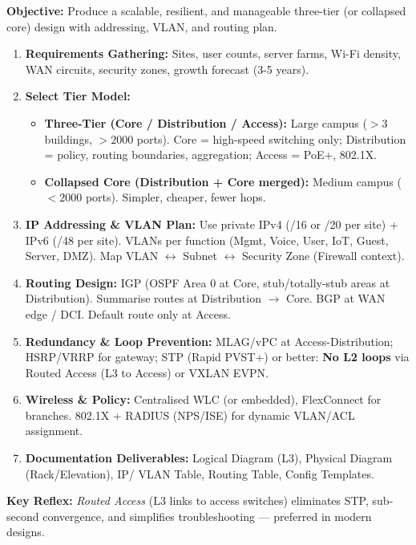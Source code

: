 \documentclass[11pt]{article}
\begin{document}
\begin{methode}
\textbf{Objective:} Produce a scalable, resilient, and manageable three-tier (or collapsed core) design with addressing, VLAN, and routing plan.
\begin{enumerate}
    \item \textbf{Requirements Gathering:} Sites, user counts, server farms, Wi-Fi density, WAN circuits, security zones, growth forecast (3-5 years).
    \item \textbf{Select Tier Model:}
    \begin{itemize}
        \item \textbf{Three-Tier (Core / Distribution / Access):} Large campus ($> 3$ buildings, $> 2000$ ports). Core = high-speed switching only; Distribution = policy, routing boundaries, aggregation; Access = PoE+, 802.1X.
        \item \textbf{Collapsed Core (Distribution + Core merged):} Medium campus ($< 2000$ ports). Simpler, cheaper, fewer hops.
    \end{itemize}
    \item \textbf{IP Addressing \& VLAN Plan:} Use private IPv4 (/16 or /20 per site) + IPv6 (/48 per site). VLANs per function (Mgmt, Voice, User, IoT, Guest, Server, DMZ). Map VLAN $\leftrightarrow$ Subnet $\leftrightarrow$ Security Zone (Firewall context).
    \item \textbf{Routing Design:} IGP (OSPF Area 0 at Core, stub/totally-stub areas at Distribution). Summarise routes at Distribution $\rightarrow$ Core. BGP at WAN edge / DCI. Default route only at Access.
    \item \textbf{Redundancy \& Loop Prevention:} MLAG/vPC at Access-Distribution; HSRP/VRRP for gateway; STP (Rapid PVST+) or better: \textbf{No L2 loops} via Routed Access (L3 to Access) or VXLAN EVPN.
    \item \textbf{Wireless \& Policy:} Centralised WLC (or embedded), FlexConnect for branches. 802.1X + RADIUS (NPS/ISE) for dynamic VLAN/ACL assignment.
    \item \textbf{Documentation Deliverables:} Logical Diagram (L3), Physical Diagram (Rack/Elevation), IP/ VLAN Table, Routing Table, Config Templates.
\end{enumerate}
\textbf{Key Reflex:} \emph{Routed Access} (L3 links to access switches) eliminates STP, sub-second convergence, and simplifies troubleshooting --- preferred in modern designs.
\end{methode}
\end{document}

